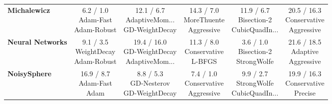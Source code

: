 \documentclass[10pt]{article}
\begin{document}
\begin{longtable}{lccccc}
\textbf{Michalewicz} & \cellcolor{green!20} \makecell{6.2 / 1.0 \\ \scriptsize{Adam-Fast} \\ \scriptsize{Adam-Robust}}&  \makecell{12.1 / 6.7 \\ \scriptsize{AdaptiveMom...} \\ \scriptsize{GD-WeightDecay}}&  \makecell{14.3 / 7.0 \\ \scriptsize{MoreThuente} \\ \scriptsize{Aggressive}}&  \makecell{11.9 / 6.7 \\ \scriptsize{Bisection-2} \\ \scriptsize{CubicQuadIn...}}& \cellcolor{red!15} \makecell{20.5 / 16.3 \\ \scriptsize{Conservative} \\ \scriptsize{Aggressive}} \\
\textbf{Neural Networks} &  \makecell{9.1 / 3.5 \\ \scriptsize{WeightDecay} \\ \scriptsize{Adam-Robust}}&  \makecell{19.4 / 16.0 \\ \scriptsize{GD-WeightDecay} \\ \scriptsize{AdaptiveMom...}}&  \makecell{11.3 / 8.0 \\ \scriptsize{Conservative} \\ \scriptsize{L-BFGS}}& \cellcolor{green!20} \makecell{3.6 / 1.0 \\ \scriptsize{Bisection-2} \\ \scriptsize{StrongWolfe}}& \cellcolor{red!15} \makecell{21.6 / 18.5 \\ \scriptsize{Adaptive} \\ \scriptsize{Aggressive}} \\
\textbf{NoisySphere} &  \makecell{16.9 / 8.7 \\ \scriptsize{Adam-Fast} \\ \scriptsize{Adam}}&  \makecell{8.8 / 5.3 \\ \scriptsize{GD-Nesterov} \\ \scriptsize{GD-WeightDecay}}& \cellcolor{green!20} \makecell{7.4 / 1.0 \\ \scriptsize{Conservative} \\ \scriptsize{Aggressive}}&  \makecell{9.9 / 2.7 \\ \scriptsize{StrongWolfe} \\ \scriptsize{CubicQuadIn...}}& \cellcolor{red!15} \makecell{19.9 / 16.3 \\ \scriptsize{Conservative} \\ \scriptsize{Precise}} \\

\end{longtable}
\end{document}
